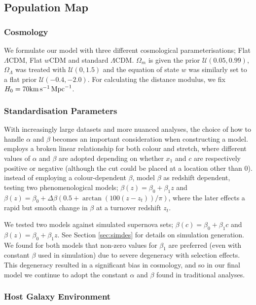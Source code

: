 \documentclass[a4paper,fleqn,usenatbib]{mnras}
\newcommand{\kmsmpc}{{\rm km}\,{\rm s}^{-1}\,{\rm Mpc}^{-1}}
\newcommand{\rubin}{\citetalias{Rubin2015}}
\begin{document}
\subsection{Population Map}

\subsubsection{Cosmology}

We formulate our model with three different cosmological parameterisations; Flat $\Lambda$CDM, Flat $w$CDM and standard $\Lambda$CDM. $\Omega_m$ is given the prior $\mathcal{U}(0.05, 0.99)$, $\Omega_\Lambda$ was treated with $\mathcal{U}(0, 1.5)$ and the equation of state $w$ was similarly set to a flat prior $\mathcal{U}(-0.4, -2.0)$. For calculating the distance modulus, we fix $H_0 = 70 \kmsmpc $. 

\subsubsection{Standardisation Parameters}

With increasingly large datasets and more nuanced analyses, the choice of how to handle $\alpha$ and $\beta$ becomes an important consideration when constructing a model. {\rubin} employs a broken linear relationship for both colour and stretch, where different values of $\alpha$ and $\beta$ are adopted depending on whether $x_1$ and $c$ are respectively positive or negative (although the cut could be placed at a location other than 0). \citet{Shariff2016} instead of employing a colour-dependent $\beta$, model $\beta$ as redshift dependent, testing two phenomenological models; $\beta(z) = \beta_0 + \beta_1 z$ and $\beta(z) = \beta_0 + \Delta \beta\left(0.5 + \arctan(100(z - z_t)) / \pi\right)$, where the later effects a rapid but smooth change in $\beta$ at a turnover redshift $z_t$.

We tested two models against simulated supernova sets; $\beta(c) = \beta_0 + \beta_1 c$ and $\beta(z) = \beta_0 + \beta_1 z$. See Section \ref{sec:simdes} for details on simulation generation. We found for both models that non-zero values for $\beta_1$ are preferred (even with constant $\beta$ used in simulation) due to severe degeneracy with selection effects. This degeneracy resulted in a significant bias in cosmology, and so in our final model we continue to adopt the constant $\alpha$ and $\beta$ found in traditional analyses.

\subsubsection{Host Galaxy Environment}
\end{document}
